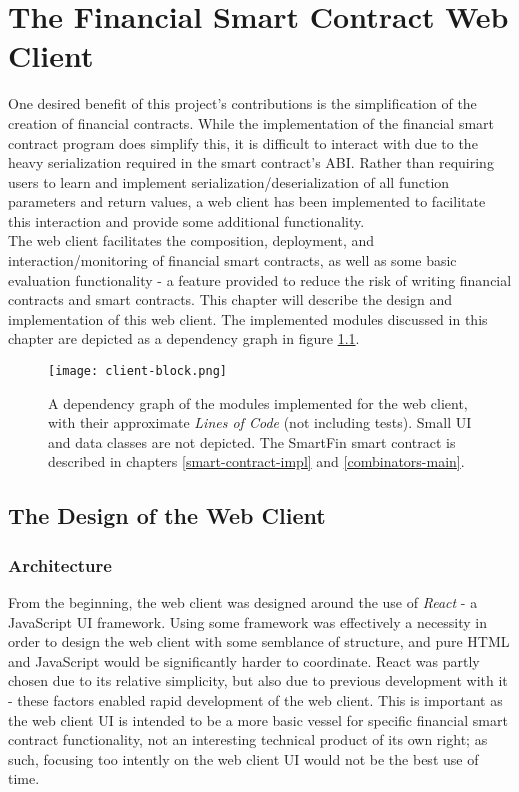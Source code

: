 \chapter{The Financial Smart Contract Web Client} \label{web-client}

One desired benefit of this project's contributions is the simplification of the creation of financial contracts. While the implementation of the financial smart contract program does simplify this, it is difficult to interact with due to the heavy serialization required in the smart contract's ABI. Rather than requiring users to learn and implement serialization/deserialization of all function parameters and return values, a web client has been implemented to facilitate this interaction and provide some additional functionality. \\

The web client facilitates the composition, deployment, and interaction/monitoring of financial smart contracts, as well as some basic evaluation functionality - a feature provided to reduce the risk of writing financial contracts and smart contracts. This chapter will describe the design and implementation of this web client. The implemented modules discussed in this chapter are depicted as a dependency graph in figure \ref{fig:client-block}. \\

\begin{figure}[h]
    \centering
    \texttt{[image: client-block.png]}
    \caption{A dependency graph of the modules implemented for the web client, with their approximate \textit{Lines of Code} (not including tests). Small UI and data classes are not depicted. The SmartFin smart contract is described in chapters \ref{smart-contract-impl} and \ref{combinators-main}.}
    \label{fig:client-block}
\end{figure}


\section{The Design of the Web Client}

\subsection{Architecture}

From the beginning, the web client was designed around the use of \textit{React}\cite{react} - a JavaScript UI framework. Using some framework was effectively a necessity in order to design the web client with some semblance of structure, and pure HTML and JavaScript would be significantly harder to coordinate. React was partly chosen due to its relative simplicity, but also due to previous development with it - these factors enabled rapid development of the web client. This is important as the web client UI is intended to be a more basic vessel for specific financial smart contract functionality, not an interesting technical product of its own right; as such, focusing too intently on the web client UI would not be the best use of time. \\

